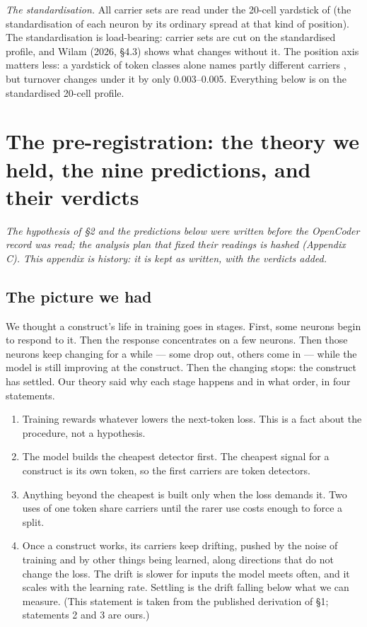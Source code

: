 \documentclass{article}
\begin{document}
\emph{The standardisation.} All carrier sets are read under the 20-cell yardstick of \citet{wilam2026} (the standardisation of each neuron by its ordinary spread at that kind of position). The standardisation is load-bearing: carrier sets are cut on the standardised profile, and Wilam (2026, \S4.3) shows what changes without it. The position axis matters less: a yardstick of token classes alone names partly different carriers \citep[\S4.3]{wilam2026}, but turnover changes under it by only 0.003--0.005. Everything below is on the standardised 20-cell profile.


\section{The pre-registration: the theory we held, the nine predictions, and their verdicts}

\emph{The hypothesis of \S2 and the predictions below were written before the OpenCoder record was read; the analysis plan that fixed their readings is hashed (Appendix C). This appendix is history: it is kept as written, with the verdicts added.}

\subsection{The picture we had}

We thought a construct's life in training goes in stages. First, some neurons begin to respond to it. Then the response concentrates on a few neurons. Then those neurons keep changing for a while --- some drop out, others come in --- while the model is still improving at the construct. Then the changing stops: the construct has settled. Our theory said why each stage happens and in what order, in four statements.

\begin{enumerate}[topsep=2pt,itemsep=1pt,parsep=0pt,partopsep=0pt,leftmargin=*]
\item Training rewards whatever lowers the next-token loss. This is a fact about the procedure, not a hypothesis.
\item The model builds the cheapest detector first. The cheapest signal for a construct is its own token, so the first carriers are token detectors.
\item Anything beyond the cheapest is built only when the loss demands it. Two uses of one token share carriers until the rarer use costs enough to force a split.
\item Once a construct works, its carriers keep drifting, pushed by the noise of training and by other things being learned, along directions that do not change the loss. The drift is slower for inputs the model meets often, and it scales with the learning rate. Settling is the drift falling below what we can measure. (This statement is taken from the published derivation of \S1; statements 2 and 3 are ours.)
\end{enumerate}
\end{document}
